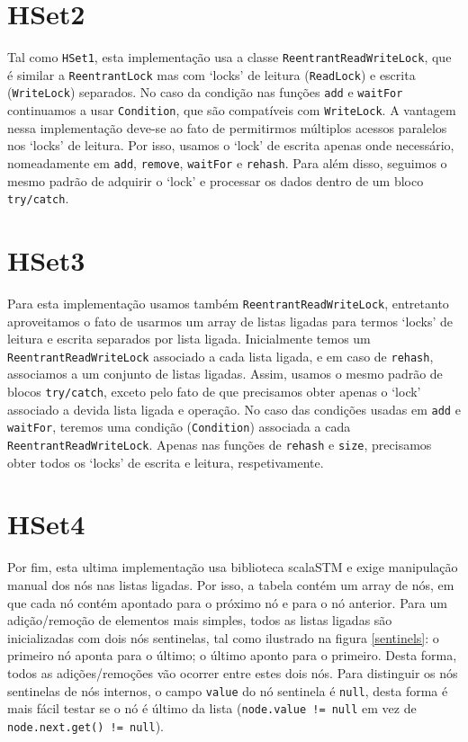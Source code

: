 \documentclass{report}
\begin{document}
\section{HSet2}
    Tal como \texttt{HSet1}, esta implementação usa a classe \texttt{ReentrantReadWriteLock}, que é similar a \texttt{ReentrantLock} mas com `locks' de leitura (\texttt{ReadLock}) e escrita (\texttt{WriteLock}) separados. No caso da condição nas funções \texttt{add} e \texttt{waitFor} continuamos a usar \texttt{Condition}, que são compatíveis com \texttt{WriteLock}. A vantagem nessa implementação deve-se ao fato de permitirmos múltiplos acessos paralelos nos `locks' de leitura. Por isso, usamos o `lock' de escrita apenas onde necessário, nomeadamente em \texttt{add}, \texttt{remove}, \texttt{waitFor} e \texttt{rehash}. Para além disso, seguimos o mesmo padrão de adquirir o `lock' e processar os dados dentro de um bloco \texttt{try/catch}.

\section{HSet3}
Para esta implementação usamos também \texttt{ReentrantReadWriteLock}, entretanto aproveitamos o fato de usarmos um array de listas ligadas para termos `locks' de leitura e escrita separados por lista ligada. Inicialmente temos um \texttt{ReentrantReadWriteLock} associado a cada lista ligada, e em caso de \texttt{rehash}, associamos a um conjunto de listas ligadas. Assim, usamos o mesmo padrão de blocos \texttt{try/catch}, exceto pelo fato de que precisamos obter apenas o `lock' associado a devida lista ligada e operação. No caso das condições usadas em \texttt{add} e \texttt{waitFor}, teremos uma condição (\texttt{Condition}) associada a cada \texttt{ReentrantReadWriteLock}. Apenas nas funções de \texttt{rehash} e \texttt{size}, precisamos obter todos os `locks' de escrita e leitura, respetivamente.

\section{HSet4}
Por fim, esta ultima implementação usa biblioteca scalaSTM e exige manipulação manual dos nós nas listas ligadas. Por isso, a tabela contém um array de nós, em que cada nó contém apontado para o próximo nó e para o nó anterior. Para um adição/remoção de elementos mais simples, todos as listas ligadas são inicializadas com dois nós sentinelas, tal como ilustrado na figura \ref{sentinels}: o primeiro nó aponta para o último; o último aponto para o primeiro. Desta forma, todos as adições/remoções vão ocorrer entre estes dois nós. Para distinguir os nós sentinelas de nós internos, o campo \texttt{value} do nó sentinela é \texttt{null}, desta forma é mais fácil testar se o nó é último da lista (\texttt{node.value != null} em vez de \texttt{node.next.get() != null}).
\end{document}

